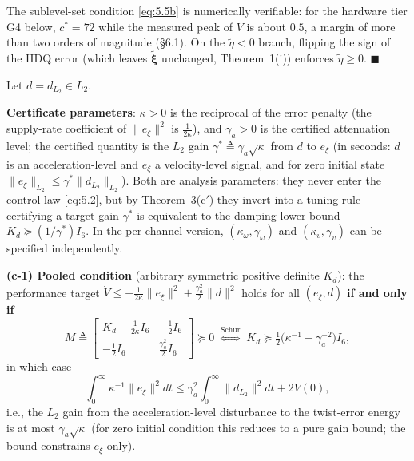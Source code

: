 \begin{remark}
The sublevel-set condition \eqref{eq:5.5b} is numerically verifiable: for the hardware tier G4 below, $c^{*}=72$ while the measured peak of $V$ is about $0.5$, a margin of more than two orders of magnitude (\S6.1). On the $\tilde\eta<0$ branch, flipping the sign of the HDQ error (which leaves $\tilde{\boldsymbol\xi}$ unchanged, Theorem~1(i)) enforces $\tilde\eta\ge0$. $\blacksquare$
\end{remark}

\renewcommand{\thetheorem}{3(c)}%
\begin{theorem}\label{thm:3c}
Let $d=d_{L_2}\in L_2$.

\textbf{Certificate parameters}: $\kappa>0$ is the reciprocal of the error penalty (the supply-rate coefficient of $\|e_\xi\|^2$ is $\tfrac1{2\kappa}$), and $\gamma_a>0$ is the certified attenuation level; the certified quantity is the $L_2$ gain $\gamma^{*}\triangleq\gamma_a\sqrt\kappa$ from $d$ to $e_\xi$ (in seconds: $d$ is an acceleration-level and $e_\xi$ a velocity-level signal, and for zero initial state $\|e_\xi\|_{L_2}\le\gamma^{*}\|d_{L_2}\|_{L_2}$). Both are analysis parameters: they never enter the control law \eqref{eq:5.2}, but by Theorem~3(c$'$) they invert into a tuning rule---certifying a target gain $\gamma^{*}$ is equivalent to the damping lower bound $K_d\succeq(1/\gamma^{*})I_6$. In the per-channel version, $(\kappa_\omega,\gamma_\omega)$ and $(\kappa_v,\gamma_v)$ can be specified independently.

\textbf{(c-1) Pooled condition} (arbitrary symmetric positive definite $K_d$): the performance target $\dot V\le-\tfrac1{2\kappa}\|e_\xi\|^2+\tfrac{\gamma_a^2}2\|d\|^2$ holds for all $(e_\xi,d)$ \textbf{if and only if}
\begin{equation}
M\triangleq\begin{bmatrix}K_d-\tfrac1{2\kappa}I_6 & -\tfrac12 I_6\\[2pt] -\tfrac12 I_6 & \tfrac{\gamma_a^2}2 I_6\end{bmatrix}\succeq0
\;\overset{\text{Schur}}{\Longleftrightarrow}\;
K_d\succeq\tfrac12\bigl(\kappa^{-1}+\gamma_a^{-2}\bigr)I_6 ,
\tag{5.6a}\label{eq:5.6a}
\end{equation}
in which case
\begin{equation}
\int_0^\infty\kappa^{-1}\|e_\xi\|^2dt\le\gamma_a^2\int_0^\infty\|d_{L_2}\|^2dt+2V(0),
\tag{5.6}\label{eq:5.6}
\end{equation}
i.e., the $L_2$ gain from the acceleration-level disturbance to the twist-error energy is at most $\gamma_a\sqrt\kappa$ (for zero initial condition this reduces to a pure gain bound; the bound constrains $e_\xi$ only).


\end{theorem}
